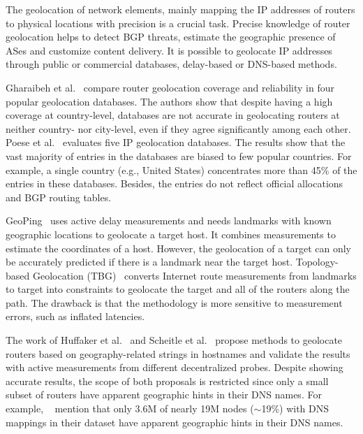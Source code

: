 	The geolocation of network elements, mainly mapping the IP addresses of routers to physical locations with precision is a crucial task. Precise knowledge of router geolocation helps to detect BGP threats, estimate the geographic presence of ASes and customize content delivery. It is possible to geolocate IP addresses through public or commercial databases, delay-based or DNS-based methods.

	Gharaibeh et al.~\cite{Gharaibeh:2017:LRG:3131365.3131380} compare router geolocation coverage and reliability in four popular geolocation databases. The authors show that despite having a  high coverage at country-level, databases are not accurate in geolocating routers at neither country- nor city-level, even if they agree significantly among each other. Poese et al.~\cite{Poese:2011:IGD:1971162.1971171} evaluates five IP geolocation databases. The results show that the vast majority of entries in the databases are biased to few popular countries. For example, a single country (e.g., United States) concentrates more than 45\% of the entries in these databases. Besides, the entries do not reflect official allocations and BGP routing tables.

	GeoPing~\cite{Padmanabhan:2001:IGM:383059.383073} uses active delay measurements and needs landmarks with known geographic locations to geolocate a target host. It combines measurements to estimate the coordinates of a host. However, the geolocation of a target can only be accurately predicted if there is a landmark near the target host. Topology-based Geolocation (TBG)~\cite{Katz-Bassett:2006:TIG:1177080.1177090} converts Internet route measurements from landmarks to target into constraints to geolocate the target and all of the routers along the path. The drawback is that the methodology is more sensitive to measurement errors, such as inflated latencies.

	The work of Huffaker et al.~\cite{Huffaker:2014:DDR:2656877.2656879} and Scheitle et al.~\cite{8002903} propose methods to geolocate routers based on geography-related strings in hostnames and validate the results with active measurements from different decentralized probes. Despite showing accurate results, the scope of both proposals is restricted since only a small subset of routers have apparent geographic hints in their DNS names. For example, ~\cite{Huffaker:2014:DDR:2656877.2656879} mention that only 3.6M of nearly 19M nodes ($\sim$19\%) with DNS mappings in their dataset have apparent geographic hints in their DNS names. 


